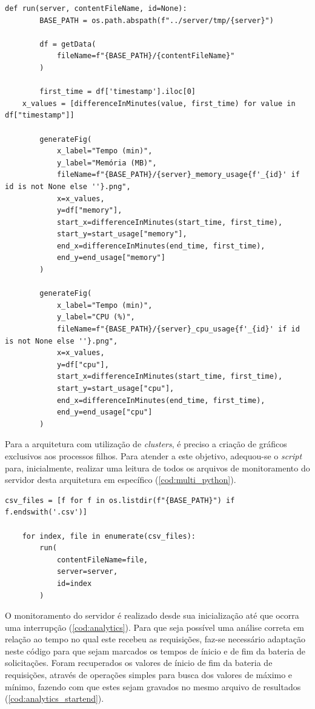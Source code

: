 \documentclass[12pt]{article}
\begin{document}
\begin{lstlisting}[caption={\textit{Script} base em \textit{Python} para geração de gráficos.}, label=cod:base_python]
	def run(server, contentFileName, id=None):
		BASE_PATH = os.path.abspath(f"../server/tmp/{server}")

		df = getData(
			fileName=f"{BASE_PATH}/{contentFileName}"
		)

		first_time = df['timestamp'].iloc[0]
  	x_values = [differenceInMinutes(value, first_time) for value in df["timestamp"]]

		generateFig(
			x_label="Tempo (min)",
			y_label="Memória (MB)",
			fileName=f"{BASE_PATH}/{server}_memory_usage{f'_{id}' if id is not None else ''}.png",
			x=x_values,
			y=df["memory"],
			start_x=differenceInMinutes(start_time, first_time),
			start_y=start_usage["memory"],
			end_x=differenceInMinutes(end_time, first_time),
			end_y=end_usage["memory"]
		)

		generateFig(
			x_label="Tempo (min)",
			y_label="CPU (%)",
			fileName=f"{BASE_PATH}/{server}_cpu_usage{f'_{id}' if id is not None else ''}.png",
			x=x_values,
			y=df["cpu"],
			start_x=differenceInMinutes(start_time, first_time),
			start_y=start_usage["cpu"],
			end_x=differenceInMinutes(end_time, first_time),
			end_y=end_usage["cpu"]
		)
\end{lstlisting}

Para a arquitetura com utilização de \textit{clusters}, é preciso a criação de gráficos exclusivos aos processos
filhos. Para atender a este objetivo, adequou-se o \textit{script} para, 
inicialmente, realizar uma leitura de todos os arquivos de monitoramento do servidor desta arquitetura em específico (\autoref{cod:multi_python}).

\begin{lstlisting}[caption={Geração dos gráficos para servidor com arquitetura de \textit{cluster}}, label=cod:multi_python]
	csv_files = [f for f in os.listdir(f"{BASE_PATH}") if f.endswith('.csv')]

	for index, file in enumerate(csv_files):
		run(
			contentFileName=file,
			server=server,
			id=index
		)
\end{lstlisting}

O monitoramento do servidor é realizado desde sua inicialização até que ocorra uma interrupção (\autoref{cod:analytics}). Para que seja possível uma
análise correta em relação ao tempo no qual este recebeu as requisições, faz-se necessário adaptação neste código para
que sejam marcados os tempos de ínicio e de fim da bateria de solicitações. Foram recuperados os valores de ínicio de fim da bateria de
requisições, através de operações simples para busca dos valores de máximo e mínimo, fazendo com que estes sejam
gravados no mesmo arquivo de resultados (\autoref{cod:analytics_startend}).
\end{document}
